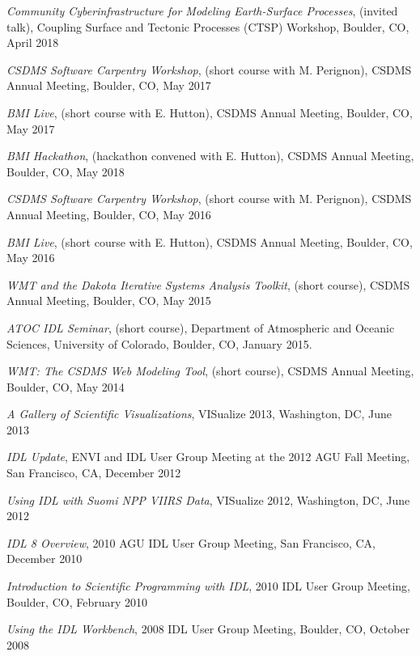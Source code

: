 \begin{enumerate}[{[}1{]}]
  \item \textit{Community Cyberinfrastructure for Modeling
    Earth-Surface Processes}, (invited talk), Coupling Surface and
    Tectonic Processes (CTSP) Workshop, Boulder, CO, April 2018

  \item \textit{CSDMS Software Carpentry Workshop}, (short course with
    M. Perignon), CSDMS Annual Meeting, Boulder, CO, May 2017

  \item \textit{BMI Live}, (short course with E. Hutton),
    CSDMS Annual Meeting, Boulder, CO, May 2017

  \item \textit{BMI Hackathon}, (hackathon convened with E. Hutton),
    CSDMS Annual Meeting, Boulder, CO, May 2018

  \item \textit{CSDMS Software Carpentry Workshop}, (short course with
    M. Perignon), CSDMS Annual Meeting, Boulder, CO, May 2016

  \item \textit{BMI Live}, (short course with E. Hutton),
    CSDMS Annual Meeting, Boulder, CO, May 2016

  \item \textit{WMT and the Dakota Iterative Systems Analysis Toolkit},
    (short course), CSDMS Annual Meeting, Boulder, CO, May 2015

  \item \textit{ATOC IDL Seminar}, (short course), Department of
    Atmospheric and Oceanic Sciences, University of Colorado, Boulder,
    CO, January 2015.

  \item \textit{WMT: The CSDMS Web Modeling Tool}, (short course), CSDMS
    Annual Meeting, Boulder, CO, May 2014

  \item \textit{A Gallery of Scientific Visualizations}, {VISualize} 2013,
    Washington, DC, June 2013

  \item \textit{IDL Update}, ENVI and IDL User Group Meeting at the 2012
    AGU Fall Meeting, San Francisco, CA, December 2012

  \item \textit{Using IDL with Suomi NPP VIIRS Data}, {VISualize} 2012,
    Washington, DC, June 2012

  \item \textit{IDL 8 Overview}, 2010 AGU IDL User Group Meeting, San
    Francisco, CA, December 2010

  \item \textit{Introduction to Scientific Programming with IDL}, 2010 IDL
    User Group Meeting, Boulder, CO, February 2010

  \item \textit{Using the IDL Workbench}, 2008 IDL User Group Meeting,
    Boulder, CO, October 2008

\end{enumerate}
